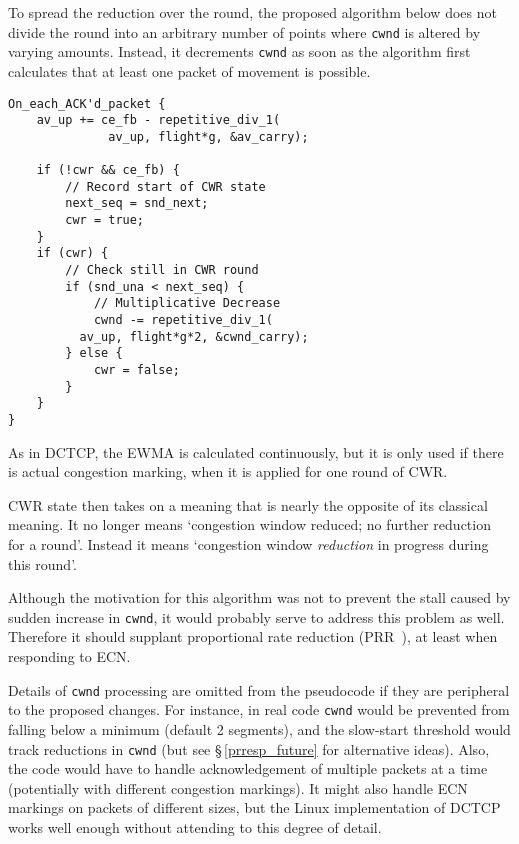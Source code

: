 To spread the reduction over the round, the proposed algorithm below does not divide the round into an arbitrary number of points where \texttt{cwnd} is altered by varying amounts. Instead, it decrements \texttt{cwnd} as soon as the algorithm first calculates that at least one packet of movement is possible. 

\begin{verbatim}
On_each_ACK'd_packet {
    av_up += ce_fb - repetitive_div_1(
              av_up, flight*g, &av_carry);

    if (!cwr && ce_fb) {
        // Record start of CWR state
        next_seq = snd_next;
        cwr = true;
    }
    if (cwr) {
        // Check still in CWR round
        if (snd_una < next_seq) {
            // Multiplicative Decrease
            cwnd -= repetitive_div_1(
          av_up, flight*g*2, &cwnd_carry);
        } else {
            cwr = false;
        }
    }
}
\end{verbatim}

As in DCTCP, the EWMA is calculated continuously, but it is only used if there is actual congestion marking, when it is applied for one round of CWR. %

CWR state then takes on a meaning that is nearly the opposite of its classical meaning. It no longer means `congestion window reduced; no further reduction for a round'. Instead it means `congestion window \emph{reduction} in progress during this round'. 

Although the motivation for this algorithm was not to prevent the stall caused by sudden increase in \texttt{cwnd}, it would probably serve to address this problem as well. Therefore it should supplant proportional rate reduction (PRR~\cite{IETF_RFC6937:PRR}), at least when responding to ECN.

Details of \texttt{cwnd} processing are omitted from the pseudocode if they are peripheral to the proposed changes. For instance, in real code \texttt{cwnd} would be prevented from falling below a minimum (default 2 segments), and the slow-start threshold would track reductions in \texttt{cwnd} (but see \S\,\ref{prresp_future} for alternative ideas). Also, the code would have to handle acknowledgement of multiple packets at a time (potentially with different congestion markings). It might also handle ECN markings on packets of different sizes, but the Linux implementation of DCTCP works well enough without attending to this degree of detail.

